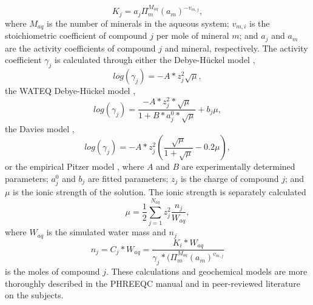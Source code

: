 \begin{supplementary}
\begin{equation}
    K_j=a_j \Pi_m^{M_{aq}} (a_m)^{-v_{m,j}},
\end{equation}
where $M_{aq}$ is the number of minerals in the aqueous system; $v_{m,i}$ is the stoichiometric coefficient of compound $j$ per mole of mineral $m$; and $a_j$ and $a_m$ are the activity coefficients of compound $j$ and mineral, respectively. The activity coefficient $\gamma_j$ is calculated through either the Debye-Hückel model \cite{Aqion2016ActivityModels},
\begin{equation}
    log⁡(\gamma_j)=-A*z_j^2\sqrt{\mu},
\end{equation}
the WATEQ Debye-Hückel model \cite{Aqion2016ActivityModels},
\begin{equation}
    log⁡(\gamma_j)=\frac{-A*z_j^2*\sqrt{\mu}}{1+B*a_j^0*\sqrt{\mu}}+b_j \mu,
\end{equation}
the Davies model \cite{Davies1938TheSulphates},
\begin{equation}
    log⁡(\gamma_j)=-A*z_j^2 (\frac{\sqrt{\mu}}{1+\sqrt{\mu}}-0.2\mu),
\end{equation}
or the empirical Pitzer model \cite{Pitzer1973ThermodynamicsEquations}, where $A$ and $B$ are experimentally determined parameters; $a_j^0$ and $b_j$ are fitted parameters; $z_j$ is the charge of compound $j$; and $\mu$ is the ionic strength of the solution. The ionic strength is separately calculated
\begin{equation}
    \mu=\frac{1}{2}\sum_{j=1}^{N_{aq}}z_j^2 \frac{n_j}{W_{aq}},
\end{equation}
where $W_{aq}$ is the simulated water mass and $n_j$ 
\begin{equation}
    n_j=C_j*W_{aq}=\frac{K_i*W_{aq}}{\gamma_j*(\Pi_m^{M_{aq}} (a_m)^{v_{m,j}}}
\end{equation}
is the moles of compound $j$. These calculations and geochemical models are more thoroughly described in the PHREEQC manual and in peer-reviewed literature on the subjects.


\end{supplementary}